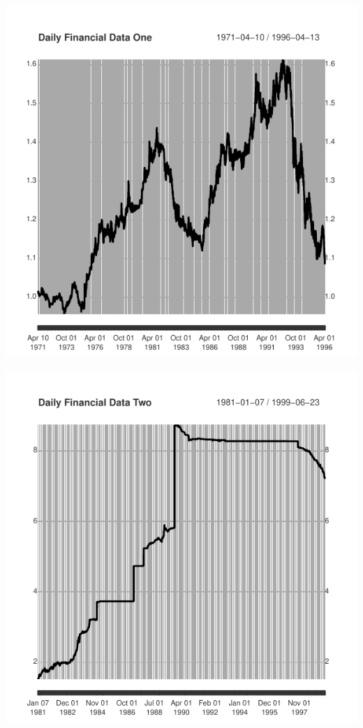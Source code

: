 \documentclass[article]{jss}\usepackage[]{graphicx}\usepackage[]{color}
\makeatletter
\def\maxwidth{ %
  \ifdim\Gin@nat@width>\linewidth
    \linewidth
  \else
    \Gin@nat@width
  \fi
}
\newenvironment{knitrout}{}{} %
\makeatother
\begin{document}
\begin{knitrout}
\color{fgcolor}

{\centering \includegraphics[width=\maxwidth]{figure/get_dat-1} 

}




{\centering \includegraphics[width=\maxwidth]{figure/get_dat-2} 

}



\end{knitrout}
\end{document}
